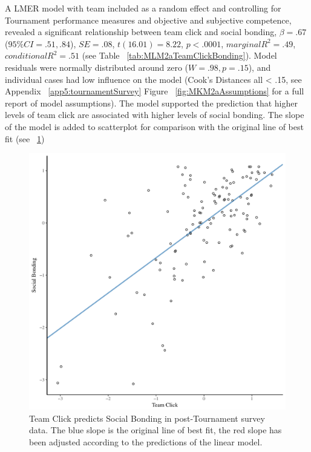  A LMER model with team included as a random effect and controlling for Tournament performance measures and objective and subjective competence, revealed a significant relationship between team click and social bonding, $\beta = .67$ ($95\% CI =  .51, .84$), $SE = .08$, $t(16.01) = 8.22$, $p < .0001$, $marginal R^2 = .49$, $conditional R^2 = .51$ (see Table ~\ref{tab:MLM2aTeamClickBonding}).  Model residuals were normally distributed around zero ($W = .98, p = .15$), and individual cases had low influence on the model (Cook's Distances all < .15, see Appendix ~\ref{app5:tournamentSurvey} Figure ~\ref{fig:MKM2aAssumptions} for a full report of model assumptions).  The model supported the prediction that higher levels of team click are associated with higher levels of social bonding.
 The slope of the model is added to scatterplot for comparison with the original line of best fit (see ~\ref{fig:clickBondModelSlope})

  

  \begin{figure}[htbp]
    \centering
  \includegraphics[scale=.5]{images/clickBondModelSlope.pdf}
    \caption{Team Click predicts Social Bonding in post-Tournament survey data. The blue slope is the original line of best fit, the red slope has been adjusted according to the predictions of the linear model.}
    \label{fig:clickBondModelSlope}
  \end{figure}



